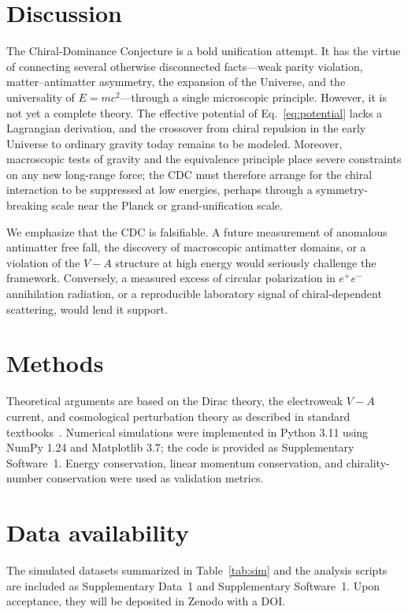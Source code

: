 \documentclass[11pt,a4paper]{article}
\begin{document}
\section*{Discussion}

The Chiral-Dominance Conjecture is a bold unification attempt. It has the virtue of connecting several otherwise disconnected facts---weak parity violation, matter--antimatter asymmetry, the expansion of the Universe, and the universality of $E=mc^2$---through a single microscopic principle. However, it is not yet a complete theory. The effective potential of Eq.~\eqref{eq:potential} lacks a Lagrangian derivation, and the crossover from chiral repulsion in the early Universe to ordinary gravity today remains to be modeled. Moreover, macroscopic tests of gravity and the equivalence principle place severe constraints on any new long-range force; the CDC must therefore arrange for the chiral interaction to be suppressed at low energies, perhaps through a symmetry-breaking scale near the Planck or grand-unification scale.

We emphasize that the CDC is falsifiable. A future measurement of anomalous antimatter free fall, the discovery of macroscopic antimatter domains, or a violation of the $V-A$ structure at high energy would seriously challenge the framework. Conversely, a measured excess of circular polarization in $e^+e^-$ annihilation radiation, or a reproducible laboratory signal of chiral-dependent scattering, would lend it support.

\section*{Methods}

Theoretical arguments are based on the Dirac theory, the electroweak $V-A$ current, and cosmological perturbation theory as described in standard textbooks~\cite{peskin1995}. Numerical simulations were implemented in Python 3.11 using NumPy 1.24 and Matplotlib 3.7; the code is provided as Supplementary Software~1. Energy conservation, linear momentum conservation, and chirality-number conservation were used as validation metrics.

\section*{Data availability}

The simulated datasets summarized in Table~\ref{tab:sim} and the analysis scripts are included as Supplementary Data~1 and Supplementary Software~1. Upon acceptance, they will be deposited in Zenodo with a DOI.
\end{document}
